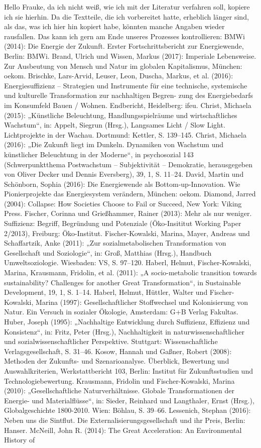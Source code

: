 Hello Frauke, da ich nicht weiß, wie ich mit der Literatur verfahren soll, kopiere ich sie hierhin. Da die Textteile, die ich vorbereitet hatte, erheblich länger sind, als das, was ich hier hin kopiert habe, könnten manche Angaben wieder rausfallen. Das kann ich gern am Ende unseres Prozesses kontrollieren: BMWi (2014): Die Energie der Zukunft. Erster Fortschrittsbericht zur Energiewende, Berlin: BMWi. Brand, Ulrich und Wissen, Markus (2017): Imperiale Lebensweise. Zur Ausbeutung von Mensch und Natur im globalen Kapitalismus, München: oekom. Brischke, Lars-Arvid, Leuser, Leon, Duscha, Markus, et al. (2016): Energiesuffizienz – Strategien und Instrumente für eine technische, systemische und kulturelle Transformation zur nachhaltigen Begren- zung des Energiebedarfs im Konsumfeld Bauen / Wohnen. Endbericht, Heidelberg: ifeu. Christ, Michaela (2015): „Künstliche Beleuchtung, Handlungsspielräume und wirtschaftliches Wachstum“, in: Appelt, Siegrun (Hrsg.), Langsames Licht / Slow Light. Lichtprojekte in der Wachau. Dortmund: Kettler, S. 139–145. Christ, Michaela (2016): „Die Zukunft liegt im Dunkeln. Dynamiken von Wachstum und künstlicher Beleuchtung in der Moderne“, in psychosozial 143 (Schwerpunktthema Postwachstum – Subjektivität – Demokratie, herausgegeben von Oliver Decker und Dennis Eversberg), 39, 1, S. 11–24. David, Martin und Schönborn, Sophia (2016): Die Energiewende als Bottom-up-Innovation. Wie Pionierprojekte das Energiesystem verändern, München: oekom. Diamond, Jarred (2004): Collapse: How Societies Choose to Fail or Succeed, New York: Viking Press. Fischer, Corinna und Grießhammer, Rainer (2013): Mehr als nur weniger. Suffizienz: Begriff, Begründung und Potenziale (Öko-Insititut Working Paper 2/2013), Freiburg: Öko-Institut. Fischer-Kowalski, Marina, Mayer, Andreas und Schaffartzik, Anke (2011): „Zur sozialmetabolischen Transformation von Gesellschaft und Soziologie“, in: Groß, Matthias (Hrsg.), Handbuch Umweltsoziologie. Wiesbaden: VS, S. 97–120. Haberl, Helmut, Fischer-Kowalski, Marina, Krausmann, Fridolin, et al. (2011): „A socio-metabolic transition towards sustainability? Challenges for another Great Transformation“, in Sustainable Development, 19, 1, S. 1–14. Haberl, Helmut, Hüttler, Walter und Fischer-Kowalski, Marina (1997): Gesellschaftlicher Stoffwechsel und Kolonisierung von Natur. Ein Versuch in sozialer Ökologie, Amsterdam: G+B Verlag Fakultas. Huber, Joseph (1995): „Nachhaltige Entwicklung durch Suffizienz, Effizienz und Konsistenz“, in: Fritz, Peter (Hrsg.), Nachhaltigkeit in naturwissenschaftlicher und sozialwissenschaftlicher Perspektive. Stuttgart: Wissenschaftliche Verlagsgesellschaft, S. 31–46. Kosow, Hannah und Gaßner, Robert (2008): Methoden der Zukunfts- und Szenarioanalyse. Überblick, Bewertung und Auswahlkriterien, Werkstattbericht 103, Berlin: Institut für Zukunftsstudien und Technologiebewertung. Krausmann, Fridolin und Fischer-Kowalski, Marina (2010): „Gesellschaftliche Naturverhältnisse. Globale Transformationen der Energie- und Materialflüsse“, in: Sieder, Reinhard und Langthaler, Ernst (Hrsg.), Globalgeschichte 1800-2010. Wien: Böhlau, S. 39–66. Lessenich, Stephan (2016): Neben uns die Sintflut. Die Externalisierungsgesellschaft und ihr Preis, Berlin: Hanser. McNeill, John R. (2014): The Great Acceleration: An Environmental History of 